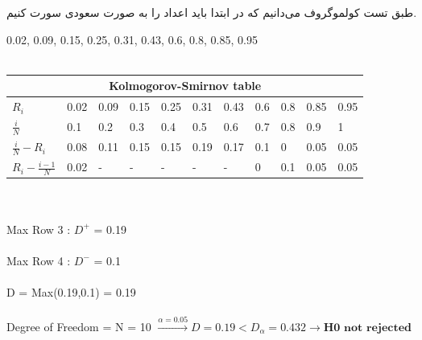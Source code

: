 
طبق تست کولموگروف می‌دانیم که در ابتدا باید اعداد را به صورت سعودی سورت کنیم.
\\
\begin{latin}
    0.02, 0.09, 0.15, 0.25, 0.31, 0.43, 0.6, 0.8, 0.85, 0.95 \\\\
    \begin{tabular}{ |p{1.5cm}||p{1cm}|p{1cm}|p{1cm}|p{1cm}|p{1cm}|p{1cm}|p{1cm}|p{1cm}|p{1cm}|p{1cm}|   }
        \hline
        \multicolumn{11}{|c|}{Kolmogorov-Smirnov table}                                           \\
        \hline
        $R_i$                 & 0.02 & 0.09 & 0.15 & 0.25 & 0.31 & 0.43 & 0.6 & 0.8 & 0.85 & 0.95 \\
        \hline
        $\frac{i}{N}$         & 0.1  & 0.2  & 0.3  & 0.4  & 0.5  & 0.6  & 0.7 & 0.8 & 0.9  & 1    \\
        \hline
        $\frac{i}{N} - R_i$   & 0.08 & 0.11 & 0.15 & 0.15 & 0.19 & 0.17 & 0.1 & 0   & 0.05 & 0.05 \\
        \hline
        $R_i - \frac{i-1}{N}$ & 0.02 & -    & -    & -    & -    & -    & 0   & 0.1 & 0.05 & 0.05 \\
        \hline
    \end{tabular}
    \\\\
    Max Row 3 :  $D^{+}$ = 0.19 \\\\
    Max Row 4 :  $D^{-}$ = 0.1 \\\\
    D = Max(0.19,0.1) = 0.19 \\\\
    Degree of Freedom = N = 10 $\xrightarrow[]{\alpha = 0.05} D = 0.19 < D_\alpha = 0.432 \rightarrow \textbf{H0 not rejected}$ 
\end{latin}

